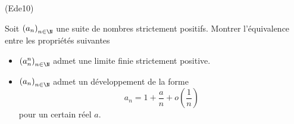 \begin{tiny}(Ede10)\end{tiny} Soit $\left( a_n\right) _{n\in \N}$ une suite de nombres strictement positifs. Montrer l'équivalence entre les propriétés suivantes
\begin{itemize}
 \item $\left( a_n^n\right) _{n\in \N}$ admet une limite finie strictement positive.
 \item $\left( a_n\right) _{n\in \N}$ admet un développement de la forme
\begin{displaymath}
 a_n = 1 + \frac{a}{n} + o(\frac{1}{n})
\end{displaymath}
pour un certain réel $a$.
\end{itemize}
 